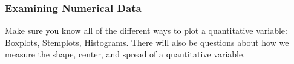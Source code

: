 \documentclass[12pt]{exam}
\newcounter{countA}
\begin{document}
\begin{questions}
\setcounter{countA}{\value{question}}
\end{questions}

\subsubsection*{Examining Numerical Data}

Make sure you know all of the different ways to plot a quantitative variable: Boxplots, Stemplots, Histograms. There will also be questions about how we measure the shape, center, and spread of a quantitative variable.
\end{document}
